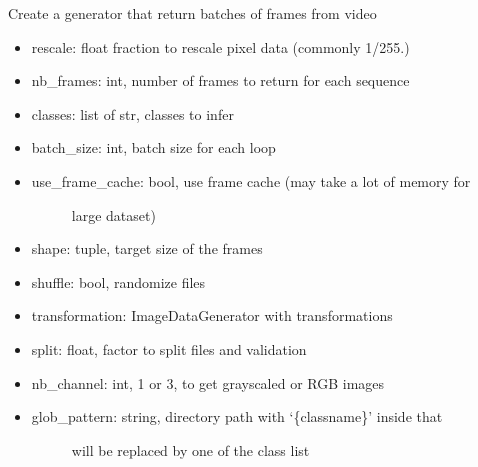 \documentclass[letterpaper,10pt,english]{sphinxmanual}
\begin{document}
\begin{fulllineitems}
\label{\detokenize{index:keras_video.generator.VideoFrameGenerator}}
Create a generator that return batches of frames from video
\begin{itemize}
\item {} 
rescale: float fraction to rescale pixel data (commonly 1/255.)

\item {} 
nb\_frames: int, number of frames to return for each sequence

\item {} 
classes: list of str, classes to infer

\item {} 
batch\_size: int, batch size for each loop

\item {} \begin{description}
\item[{use\_frame\_cache: bool, use frame cache (may take a lot of memory for}] \leavevmode
large dataset)

\end{description}

\item {} 
shape: tuple, target size of the frames

\item {} 
shuffle: bool, randomize files

\item {} 
transformation: ImageDataGenerator with transformations

\item {} 
split: float, factor to split files and validation

\item {} 
nb\_channel: int, 1 or 3, to get grayscaled or RGB images

\item {} \begin{description}
\item[{glob\_pattern: string, directory path with ‘\{classname\}’ inside that}] \leavevmode
will be replaced by one of the class list


\end{description}
\end{itemize}
\end{fulllineitems}
\end{document}
